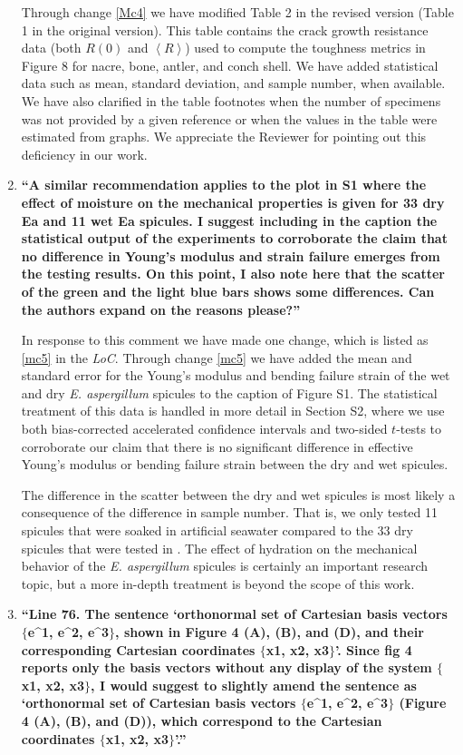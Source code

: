 \documentclass[11pt,letterpaper]{report}
\begin{document}
\begin{enumerate}[label=\textit{2.\arabic*},wide, labelwidth=!, labelindent=0pt]
Through change \ref{Mc4} we have modified Table 2 in the revised version (Table 1 in the original version). This table contains the crack growth resistance data (both $R(0)$ and $\left< R\right>$) used to compute the toughness metrics in Figure 8 for nacre, bone, antler, and conch shell. We have added statistical data such as mean, standard deviation, and sample number, when available. We have also clarified in the table footnotes when the number of specimens was not provided by a given reference or when the values in the table were estimated from graphs. We appreciate the Reviewer for pointing out this deficiency in our work.

\item \label{r2c8} {\bf ``A similar recommendation applies to the plot in S1 where the effect of moisture on the mechanical properties is given for 33 dry Ea and 11 wet Ea spicules. I suggest including in the caption the statistical output of the experiments to corroborate the claim that no difference in Young's modulus and strain failure emerges from the testing results. On this point, I also note here that the scatter of the green and the light blue bars shows some differences. Can the authors expand on the reasons please?''}

In response to this comment we have made one change, which is listed as \ref{mc5} in the \textit{LoC}.
%
Through change \ref{mc5} we have added the mean and standard error for the Young's modulus and bending failure strain of the wet and dry \textit{E. aspergillum} spicules to the caption of Figure S1. The statistical treatment of this data is handled in more detail in Section S2, where we use both bias-corrected accelerated confidence intervals and two-sided $t$-tests to corroborate our claim that there is no significant difference in effective Young's modulus or bending failure strain between the dry and wet spicules.

The difference in the scatter between the dry and wet spicules is most likely a consequence of the difference in sample number. That is, we only tested 11 spicules that were soaked in artificial seawater compared to the 33 dry spicules that were tested in \cite{monn2017enhanced}. The effect of hydration on the mechanical behavior of the \textit{E. aspergillum} spicules is certainly an important research topic, but a more in-depth treatment is beyond the scope of this work.

\item \label{r2c9} {\bf ``Line 76. The sentence `orthonormal set of Cartesian basis vectors $\{$e\string^1, e\string^2, e\string^3$\}$, shown in Figure 4 (A), (B), and (D), and their corresponding Cartesian coordinates $\{$x1, x2, x3$\}$'. Since fig 4 reports only the basis vectors without any display of the system $\{$x1, x2, x3$\}$, I would suggest to slightly amend the sentence as `orthonormal set of Cartesian basis vectors $\{$e\string^1, e\string^2, e\string^3$\}$ (Figure 4 (A), (B), and (D)), which correspond to the Cartesian coordinates $\{$x1, x2, x3$\}$'.''}


\end{enumerate}
\end{document}

